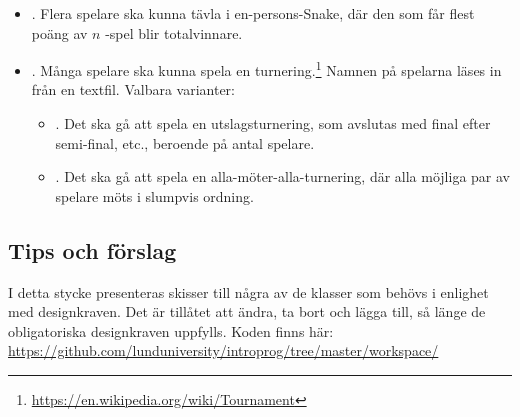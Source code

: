 \begin{itemize}[nosep, label={$\square$}]
\item \textbf{}. Flera spelare ska kunna tävla i en-persons-Snake, där den som får flest poäng av $n$ -spel blir totalvinnare.

\item \textbf{}. Många spelare ska kunna spela en turnering.\footnote{\url{https://en.wikipedia.org/wiki/Tournament}} Namnen på spelarna läses in från en textfil. Valbara varianter:

\begin{itemize}[nosep, label={$\square$}]
\item \textbf{}. Det ska gå att spela en utslagsturnering, som avslutas med final efter semi-final, etc., beroende på antal spelare.
\item \textbf{}. Det ska gå att spela en alla-möter-alla-turnering, där alla möjliga par av spelare möts i slumpvis ordning.
\end{itemize}

\end{itemize}


\subsection{Tips och förslag}\label{lab:snake:tips}

I detta stycke presenteras skisser till några av de klasser som behövs i enlighet med designkraven. Det är tillåtet att ändra, ta bort och lägga till, så länge de obligatoriska designkraven uppfylls. Koden finns här: \\
\url{https://github.com/lunduniversity/introprog/tree/master/workspace/}




